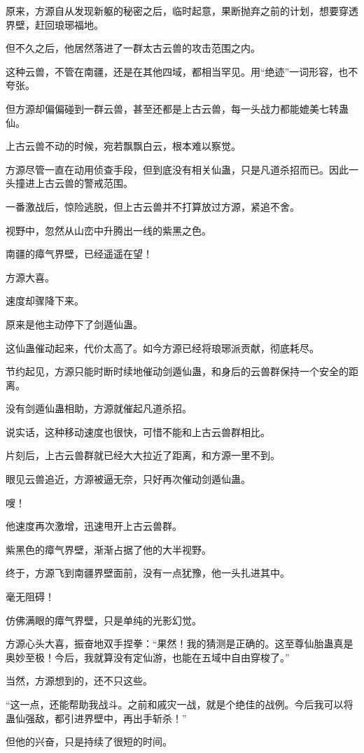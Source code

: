 \begin{this_body}
原来，方源自从发现新躯的秘密之后，临时起意，果断抛弃之前的计划，想要穿透界壁，赶回琅琊福地。

但不久之后，他居然落进了一群太古云兽的攻击范围之内。

这种云兽，不管在南疆，还是在其他四域，都相当罕见。用“绝迹”一词形容，也不夸张。

但方源却偏偏碰到一群云兽，甚至还都是上古云兽，每一头战力都能媲美七转蛊仙。

上古云兽不动的时候，宛若飘飘白云，根本难以察觉。

方源尽管一直在动用侦查手段，但到底没有相关仙蛊，只是凡道杀招而已。因此一头撞进上古云兽的警戒范围。

一番激战后，惊险逃脱，但上古云兽并不打算放过方源，紧追不舍。

视野中，忽然从山峦中升腾出一线的紫黑之色。

南疆的瘴气界壁，已经遥遥在望！

方源大喜。

速度却骤降下来。

原来是他主动停下了剑遁仙蛊。

这仙蛊催动起来，代价太高了。如今方源已经将琅琊派贡献，彻底耗尽。

节约起见，方源只能时断时续地催动剑遁仙蛊，和身后的云兽群保持一个安全的距离。

没有剑遁仙蛊相助，方源就催起凡道杀招。

说实话，这种移动速度也很快，可惜不能和上古云兽群相比。

片刻后，上古云兽群就已经大大拉近了距离，和方源一里不到。

眼见云兽追近，方源被逼无奈，只好再次催动剑遁仙蛊。

嗖！

他速度再次激增，迅速甩开上古云兽群。

紫黑色的瘴气界壁，渐渐占据了他的大半视野。

终于，方源飞到南疆界壁面前，没有一点犹豫，他一头扎进其中。

毫无阻碍！

仿佛满眼的瘴气界壁，只是单纯的光影幻觉。

方源心头大喜，振奋地双手捏拳：“果然！我的猜测是正确的。这至尊仙胎蛊真是奥妙至极！今后，我就算没有定仙游，也能在五域中自由穿梭了。”

当然，方源想到的，还不只这些。

“这一点，还能帮助我战斗。之前和戚灾一战，就是个绝佳的战例。今后我可以将蛊仙强敌，都引进界壁中，再出手斩杀！”

但他的兴奋，只是持续了很短的时间。


\end{this_body}
